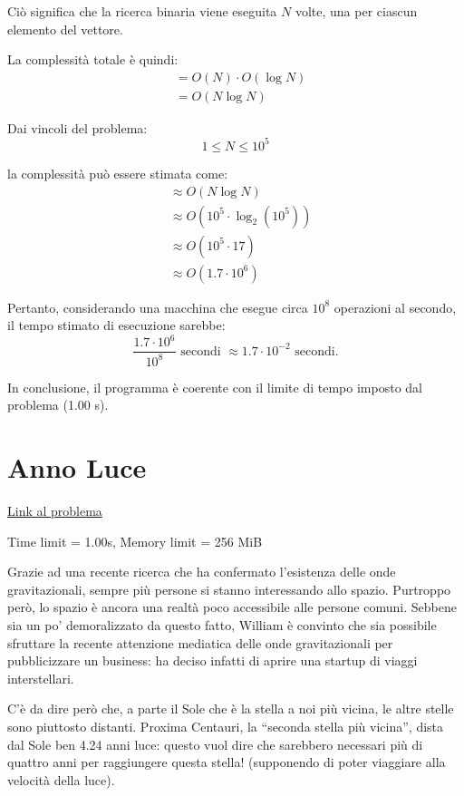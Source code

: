 Ciò significa che la ricerca binaria viene eseguita $N$ volte, una per ciascun elemento del vettore.

La complessità totale è quindi:
\begin{align*}
	&= O(N) \cdot O(\log N) \\
	&= O(N \log N)
\end{align*}

Dai vincoli del problema:
\[
1 \le N \le 10^5
\]

la complessità può essere stimata come:
\begin{align*}
	&\approx O(N \log N) \\
	&\approx O(10^5 \cdot \log_2(10^5)) \\
	&\approx O(10^5 \cdot 17) \\
	&\approx O(1.7 \cdot 10^6)
\end{align*}

Pertanto, considerando una macchina che esegue circa $10^8$ operazioni al secondo, il tempo stimato di esecuzione sarebbe:
\[
\frac{1.7 \cdot 10^6}{10^8} \text{ secondi } \approx 1.7 \cdot 10^{-2} \text{ secondi.}
\]

\noindent
In conclusione, il programma è coerente con il limite di tempo imposto dal problema (1.00 s).

\newpage
\section{Anno Luce}

\href{https://training.olinfo.it/task/ois_annoluce}{Link al problema} 

\smallskip

\noindent Time limit = 1.00s, Memory limit = 256 MiB

\bigskip

Grazie ad una recente ricerca che ha confermato l’esistenza delle onde gravitazionali, sempre più persone si stanno interessando allo spazio. Purtroppo però, lo spazio è ancora una realtà poco accessibile alle persone comuni. Sebbene sia un po’ demoralizzato da questo fatto, William è convinto che sia possibile sfruttare la recente attenzione mediatica delle onde gravitazionali per pubblicizzare un business: ha deciso infatti di aprire una startup di viaggi interstellari.

\medskip
C’è da dire però che, a parte il Sole che è la stella a noi più vicina, le altre stelle sono piuttosto distanti.
Proxima Centauri, la “seconda stella più vicina”, dista dal Sole ben 4.24 anni luce: questo vuol dire che
sarebbero necessari più di quattro anni per raggiungere questa stella! (supponendo di poter viaggiare
alla velocità della luce).

